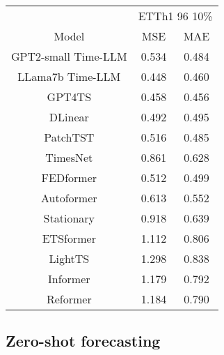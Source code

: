 \documentclass[conference]{IEEEtran}
\begin{document}
\begin{tabular}{|c|c|c|}
    \hline
                        & \multicolumn{2}{c|}{ETTh1 96 10\%}         \\
    \cline{2-3}
    Model               & MSE                                & MAE   \\
    \hline
    GPT2-small Time-LLM & 0.534                              & 0.484 \\
    \hline
    LLama7b Time-LLM    & 0.448                              & 0.460 \\
    GPT4TS              & 0.458                              & 0.456 \\
    DLinear             & 0.492                              & 0.495 \\
    PatchTST            & 0.516                              & 0.485 \\
    TimesNet            & 0.861                              & 0.628 \\
    FEDformer           & 0.512                              & 0.499 \\
    Autoformer          & 0.613                              & 0.552 \\
    Stationary          & 0.918                              & 0.639 \\
    ETSformer           & 1.112                              & 0.806 \\
    LightTS             & 1.298                              & 0.838 \\
    Informer            & 1.179                              & 0.792 \\
    Reformer            & 1.184                              & 0.790 \\
    \hline
\end{tabular}


\subsection{Zero-shot forecasting}
\end{document}
